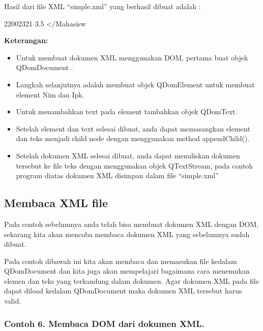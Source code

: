 Hasil dari file XML ``simple.xml'' yang berhasil dibuat adalah :

 22002321 3.5 \textless{}/Mahasisw

\textbf{Keterangan:}

\begin{itemize}
\tightlist
\item
  Untuk membuat dokumen XML menggunakan DOM, pertama buat objek
  QDomDocument .
\item
  Langkah selanjutnya adalah membuat objek QDomElement untuk membuat
  element Nim dan Ipk.
\item
  Untuk menambahkan text pada element tambahkan objek QDomText.
\item
  Setelah element dan text selesai dibuat, anda dapat memasangkan
  element dan teks menjadi child node dengan menggunakan method
  appendChild().
\item
  Setelah dokumen XML selesai dibuat, anda dapat menuliskan dokumen
  tersebut ke file teks dengan menggunakan objek QTextStream, pada
  contoh program diatas dokumen XML disimpan dalam file ``simple.xml''
\end{itemize}

\subsection{Membaca XML file}\label{membaca-xml-file}

Pada contoh sebelumnya anda telah bisa membuat dokumen XML dengan DOM,
sekarang kita akan mencoba membaca dokumen XML yang sebelumnya sudah
dibuat.

Pada contoh dibawah ini kita akan membaca dan memasukan file kedalam
QDomDocument dan kita juga akan mempelajari bagaimana cara menemukan
elemen dan teks yang terkandung dalam dokumen. Agar dokumen XML pada
file dapat diload kedalam QDomDocument maka dokumen XML tersebut harus
valid.

\subsubsection*{Contoh 6. Membaca DOM dari dokumen XML.}

